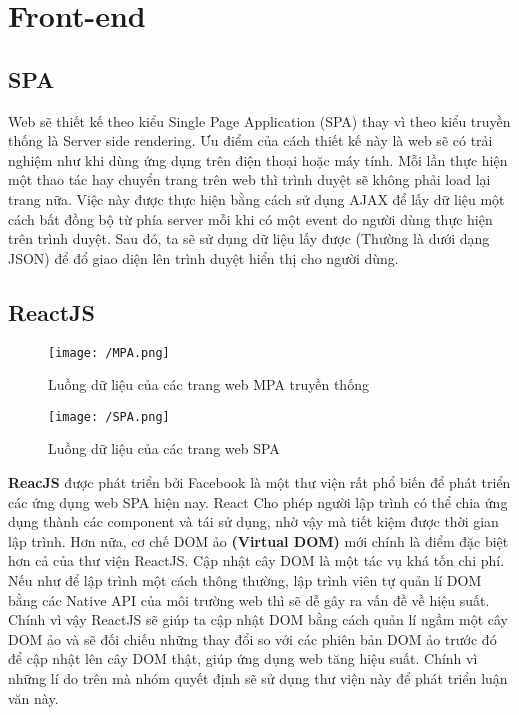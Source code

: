 \section{Front-end}
	\subsection{SPA}
	
		 Web sẽ thiết kế theo kiểu Single Page Application (SPA) thay vì theo kiểu truyền thống là Server side rendering. Ưu điểm của cách thiết kế này là web sẽ có trải nghiệm như khi dùng ứng dụng trên điện thoại hoặc máy tính. Mỗi lần thực hiện một thao tác hay chuyển trang trên web thì trình duyệt sẽ không phải load lại trang nữa. Việc này được thực hiện bằng cách sử dụng AJAX để lấy dữ liệu một cách bất đồng bộ từ phía server mỗi khi có một event do người dùng thực hiện trên trình duyệt. Sau đó, ta sẽ sử dụng dữ liệu lấy được (Thường là dưới dạng JSON) để đổ giao diện lên trình duyệt hiển thị cho người dùng.
    
	\subsection{ReactJS}
	
		\begin{figure}[!ht]
			\texttt{[image: /MPA.png]}
			\centering
			\linebreak
			\caption{Luồng dữ liệu của các trang web MPA truyền thống}
		\end{figure}
	
		\begin{figure}[!ht]
			\texttt{[image: /SPA.png]}
			\centering
			\linebreak
			\caption{Luồng dữ liệu của các trang web SPA}
		\end{figure}
	
		\textbf{ReacJS} được phát triển bởi Facebook là một thư viện rất phổ biến để phát triển các ứng dụng web SPA hiện nay. React Cho phép người lập trình có thể chia ứng dụng thành các component và tái sử dụng, nhờ vậy mà tiết kiệm được thời gian lập trình. Hơn nữa, cơ chế DOM ảo \textbf{(Virtual DOM)} mới chính là điểm đặc biệt hơn cả của thư viện ReactJS. Cập nhật cây DOM là một tác vụ khá tốn chi phí. Nếu như để lập trình một cách thông thường, lập trình viên tự quản lí DOM bằng các Native API của môi trường web thì sẽ dễ gây ra vấn đề về hiệu suất. Chính vì vậy ReactJS sẽ giúp ta cập nhật DOM bằng cách quản lí ngầm một cây DOM ảo và sẽ đối chiếu những thay đổi so với các phiên bản DOM ảo trước đó để cập nhật lên cây DOM thật, giúp ứng dụng web tăng hiệu suất. Chính vì những lí do trên mà nhóm quyết định sẽ sử dụng thư viện này để phát triển luận văn này.\\
		
